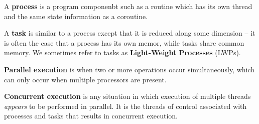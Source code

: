 \documentclass[12pt]{article}
\begin{document}
A {\bf process} is a program componenbt such as a routine which has its own thread and the same state information as a coroutine.

A {\bf task} is similar to a process except that it is reduced along some dimension -- it is often the case that a process has its own memor, while tasks share common memory. We sometimes refer to tasks as {\bf Light-Weight Processes} (LWPs).

{\bf Parallel execution} is when two or more operations occur simultaneously, which can only occur when multiple processors are present.

{\bf Concurrent execution} is any situation in which execution of multiple threads \textit{appears} to be performed in parallel. It is the threads of control associated with processes and tasks that results in concurrent execution.
\end{document}
